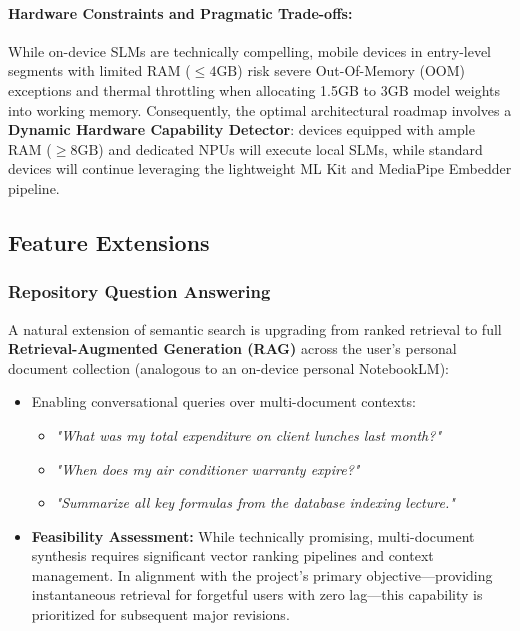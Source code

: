 \paragraph{Hardware Constraints and Pragmatic Trade-offs:}
While on-device SLMs are technically compelling, mobile devices in entry-level segments with limited RAM ($\le 4\text{GB}$) risk severe Out-Of-Memory (OOM) exceptions and thermal throttling when allocating 1.5GB to 3GB model weights into working memory. Consequently, the optimal architectural roadmap involves a \textbf{Dynamic Hardware Capability Detector}: devices equipped with ample RAM ($\ge 8\text{GB}$) and dedicated NPUs will execute local SLMs, while standard devices will continue leveraging the lightweight ML Kit and MediaPipe Embedder pipeline.

\subsection{Feature Extensions}

\subsubsection{Repository Question Answering}
A natural extension of semantic search is upgrading from ranked retrieval to full \textbf{Retrieval-Augmented Generation (RAG)} across the user's personal document collection (analogous to an on-device personal NotebookLM):
\begin{itemize}
    \item Enabling conversational queries over multi-document contexts:
    \begin{itemize}
        \item \textit{"What was my total expenditure on client lunches last month?"}
        \item \textit{"When does my air conditioner warranty expire?"}
        \item \textit{"Summarize all key formulas from the database indexing lecture."}
    \end{itemize}
    \item \textbf{Feasibility Assessment:} While technically promising, multi-document synthesis requires significant vector ranking pipelines and context management. In alignment with the project's primary objective---providing instantaneous retrieval for forgetful users with zero lag---this capability is prioritized for subsequent major revisions.
\end{itemize}

